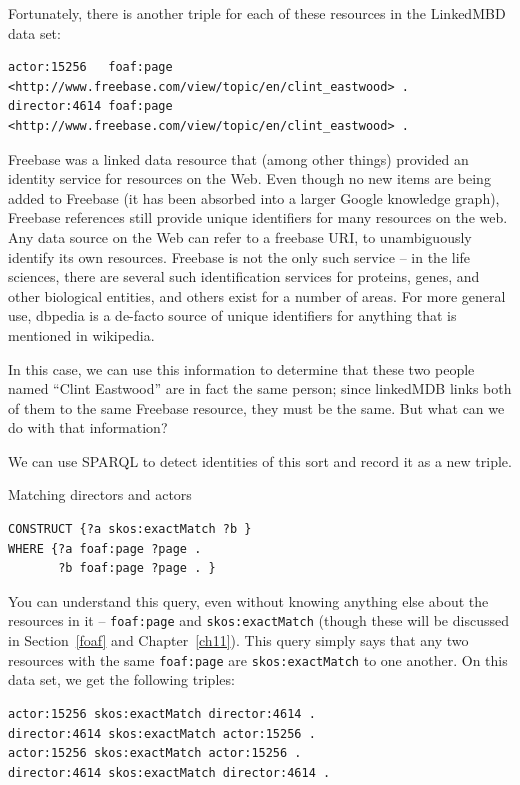 \begin{challenge}
Fortunately, there is another triple for each of these resources in the
LinkedMBD data set:

\begin{lstlisting}
actor:15256   foaf:page  <http://www.freebase.com/view/topic/en/clint_eastwood> .
director:4614 foaf:page  <http://www.freebase.com/view/topic/en/clint_eastwood> .
\end{lstlisting}

Freebase was a linked data resource that (among other things) provided an
identity service for resources on the Web. Even though no new items are being added to Freebase
(it has been absorbed into a larger Google knowledge graph), Freebase references still provide unique
identifiers for many resources on the web. 
Any data source on the Web
can refer to a freebase URI, to unambiguously identify its own
resources. Freebase is not the only such service -- in the life
sciences, there are several such identification services for proteins,
genes, and other biological entities, and others exist for a number of
areas.  For more general use, dbpedia is a de-facto source of unique identifiers for anything that
is mentioned in wikipedia. 

In this case, we can use this information to determine that these two
people named ``Clint Eastwood'' are in fact the same person; since
linkedMDB links both of them to the same Freebase resource, they must be
the same. But what can we do with that information?

We can use SPARQL to detect identities of this sort and record it as a
new triple.

\begin{query}Matching directors and actors\end{query}
\begin{lstlisting}
CONSTRUCT {?a skos:exactMatch ?b }
WHERE {?a foaf:page ?page .
       ?b foaf:page ?page . }
\end{lstlisting}

You can understand this query, even without knowing anything else about
the resources in it -- \texttt{foaf:page} and \texttt{skos:exactMatch} (though these will
be discussed in Section~\ref{foaf} and Chapter~\ref{ch11}). This query simply says that any two
resources with the same \texttt{foaf:page} are \texttt{skos:exactMatch} to one another. On
this data set, we get the following triples:

\begin{lstlisting}
actor:15256 skos:exactMatch director:4614 .
director:4614 skos:exactMatch actor:15256 .
actor:15256 skos:exactMatch actor:15256 .
director:4614 skos:exactMatch director:4614 .
\end{lstlisting}


\end{challenge}
